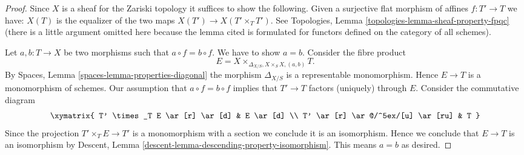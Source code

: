 \begin{proof}
Since $X$ is a sheaf for the Zariski topology it suffices to show
the following. Given a surjective flat morphism of affines
$f : T' \to T$ we have:
$X(T)$ is the equalizer of the two maps $X(T') \to X(T' \times_T T')$.
See Topologies, Lemma \ref{topologies-lemma-sheaf-property-fpqc}
(there is a little argument omitted here because the lemma cited
is formulated for functors defined on the category of all schemes).

\medskip\noindent
Let $a, b : T \to X$ be two morphisms such that $a \circ f = b \circ f$.
We have to show $a = b$. Consider the fibre product
$$
E = X \times_{\Delta_{X/S}, X \times_S X, (a, b)} T.
$$
By Spaces, Lemma \ref{spaces-lemma-properties-diagonal}
the morphism $\Delta_{X/S}$ is a representable monomorphism. Hence
$E \to T$ is a monomorphism of schemes. Our assumption that
$a \circ f = b \circ f$ implies that $T' \to T$ factors (uniquely) through $E$.
Consider the commutative diagram
$$
\xymatrix{
T' \times_T E \ar[r] \ar[d] & E \ar[d] \\
T' \ar[r] \ar@/^5ex/[u] \ar[ru] & T
}
$$
Since the projection $T' \times_T E \to T'$ is a monomorphism
with a section we conclude it is an isomorphism. Hence we conclude that
$E \to T$ is an isomorphism by
Descent, Lemma \ref{descent-lemma-descending-property-isomorphism}.
This means $a = b$ as desired.


\end{proof}
